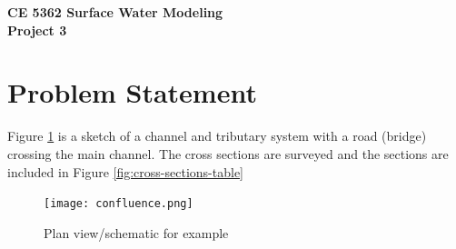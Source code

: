 \documentclass[12pt]{article}
\begin{document}
\begin{center}
{\textbf{{ CE 5362 Surface Water Modeling} \\ {Project 3}}}
\end{center}

\section*{{Problem Statement}}
Figure  \ref{fig:confluence} is a sketch of a channel and tributary system with a road (bridge) crossing the main channel.  The cross sections are surveyed and the sections are included in Figure \ref{fig:cross-sections-table}

\begin{figure}[h!] %
   \centering
   \texttt{[image: confluence.png]} 
   \caption{Plan view/schematic for example}
   \label{fig:confluence}
\end{figure}
\end{document}
